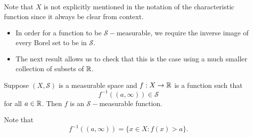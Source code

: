\documentclass[11pt,a4paper]{book}
\begin{document}
Note that \( X  \) is not explicitly mentioned in the notation of the characteristic function since it always be clear from context.

\begin{itemize}
    \item In order for a function to be \( \mathcal{S}- \)measurable, we require the inverse image of every Borel set to be in \( \mathcal{S} \).
    \item The next result allows us to check that this is the case using a much smaller collection of subsets of \( \mathbb{R}  \).
\end{itemize}

\begin{prop}
    Suppose \( (X, \mathcal{S}) \) is a measurable space and \( f: X \to \mathbb{R}  \) is a function such that 
    \[  f^{-1}((a,\infty )) \in \mathcal{S} \]
    for all \( a \in \mathbb{R}  \). Then \( f  \) is an \( \mathcal{S}- \)measurable function.
\end{prop}

Note that
\[  f^{-1}((a,\infty )) = \{  x \in X : f(x) > a \}. \]
\end{document}
